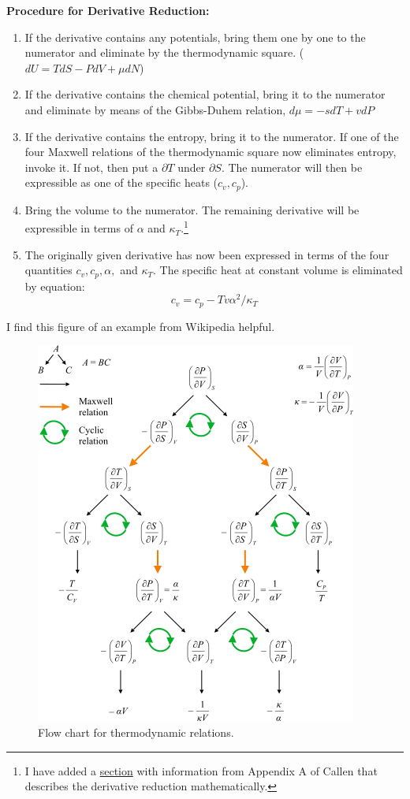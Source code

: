\newpage
\textbf{Procedure for Derivative Reduction:}

\begin{enumerate}
    \item If the derivative contains any potentials, bring them one by one to the numerator and eliminate by the thermodynamic square. ($dU=TdS-PdV+\mu dN$)
    \item If the derivative contains the chemical potential, bring it to the numerator and eliminate by means of the Gibbs-Duhem relation, $d\mu = -s dT + v dP$
    \item If the derivative contains the entropy, bring it to the numerator. If one of the four Maxwell relations of the thermodynamic square now eliminates entropy, invoke it. If not, then put a $\partial T$ under $\partial S$. The numerator will then be expressible as one of the specific heats ($c_v,c_p$).
    \item Bring the volume to the numerator. The remaining derivative will be expressible in terms of $\alpha$ and $\kappa_T$.\footnote{I have added a \hyperref[subsec::partials]{section} with information from Appendix A of Callen that describes the derivative reduction mathematically.}
    \item The originally given derivative has now been expressed in terms of the four quantities $c_v,c_p,\alpha,$ and $\kappa_T$. The specific heat at constant volume is eliminated by equation:
    \[
    c_v = c_p -Tv\alpha^2/\kappa_T
    \]
\end{enumerate}


I find this figure of an example from Wikipedia helpful.
\begin{figure}[!h]
    \centering
    \includegraphics[scale=0.48]{Images/thermo-flow.png}
    \caption{Flow chart for thermodynamic relations.}
    \label{fig:derivflow}
\end{figure}